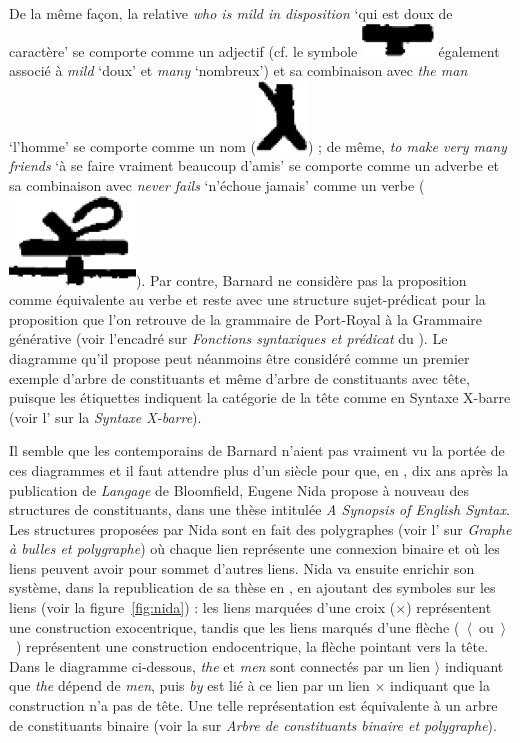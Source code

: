 {    De la même façon, la relative \textit{who is mild in disposition} ‘qui est doux de caractère’ se comporte comme un adjectif (cf. le symbole \includegraphics[height=1.1ex]{figures/vol1syntaxe2-img021.png} également associé à \textit{mild} ‘doux’ et \textit{many} ‘nombreux’) et sa combinaison avec \textit{the man} ‘l’homme’ se comporte comme un nom (\includegraphics[height=1.7ex]{figures/vol1syntaxe2-img022.png}) ; de même, \textit{to make very many friends} ‘à se faire vraiment beaucoup d’amis’ se comporte comme un adverbe et sa combinaison avec \textit{never fails} ‘n’échoue jamais’ comme un verbe (\includegraphics[height=1.7ex]{figures/vol1syntaxe2-img020.png}). Par contre, Barnard ne considère pas la proposition comme équivalente au verbe et reste avec une structure sujet-prédicat pour la proposition que l’on retrouve de la grammaire de Port-Royal à la Grammaire générative (voir l’encadré sur \textit{Fonctions syntaxiques et prédicat} du ). Le diagramme qu’il propose peut néanmoins être considéré comme un premier exemple d’arbre de constituants et même d’arbre de constituants avec tête, puisque les étiquettes indiquent la catégorie de la tête comme en Syntaxe X-barre (voir l’ sur la \textit{Syntaxe X-barre}).
    
    Il semble que les contemporains de Barnard n’aient pas vraiment vu la portée de ces diagrammes et il faut attendre plus d’un siècle pour que, en \citeyear{nida1943morphology}, dix ans après la publication de \textit{Langage} de Bloomfield, Eugene Nida propose à nouveau des structures de constituants, dans une thèse intitulée \textit{A Synopsis of English Syntax}. Les structures proposées par Nida sont en fait des polygraphes (voir l’ sur \textit{Graphe à bulles et polygraphe}) où chaque lien représente une connexion binaire et où les liens peuvent avoir pour sommet d’autres liens. Nida va ensuite enrichir son système, dans la republication de sa thèse en \citeyear{nida1966synopsys}, en ajoutant des symboles sur les liens (voir la figure~\ref{fig:nida}) : les liens marquées d’une croix ($\times$) représentent une construction exocentrique, tandis que les liens marqués d’une flèche (~$\langle$~ou~$\rangle$~) représentent une construction endocentrique, la flèche pointant vers la tête. Dans le diagramme ci-dessous, \textit{the} et \textit{men} sont connectés par un lien $\rangle$ indiquant que \textit{the} dépend de \textit{men}, puis \textit{by} est lié à ce lien par un lien $\times$ indiquant que la construction n’a pas de tête. Une telle représentation est équivalente à un arbre de constituants binaire (voir la  sur \textit{Arbre de constituants binaire et polygraphe}).

}
